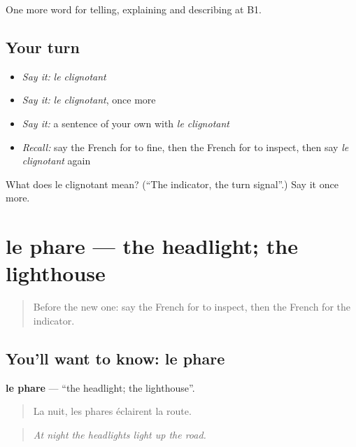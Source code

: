 \begin{grammarlens}[title={What you've built}]
One more word for telling, explaining and describing at B1.
\end{grammarlens}

\subsection*{Your turn}
\begin{itemize}
\raggedright
  \item \emph{Say it:} \emph{le clignotant}
  \item \emph{Say it:} \emph{le clignotant}, once more
  \item \emph{Say it:} a sentence of your own with \emph{le clignotant}
  \item \emph{Recall:} say the French for to fine, then the French for to inspect, then say \emph{le clignotant} again
\end{itemize}

\begin{tcolorbox}[breakable,colback=teal!4,colframe=teal!35!black,title={Before you move on}]
What does le clignotant mean? (\textquotedblleft{}The indicator, the turn signal\textquotedblright{}.) Say it once more.
\end{tcolorbox}
\section[le phare]{le phare — the headlight; the lighthouse}

\label{lesson:FR-C409-phare}



\begin{quote}
Before the new one: say the French for to inspect, then the French for the indicator.
\end{quote}

\subsection*{You'll want to know: le phare}
\textbf{le phare} — \textquotedblleft{}the headlight; the lighthouse\textquotedblright{}.

\begin{quote}
La nuit, les phares éclairent la route.
\end{quote}

\begin{quote}
\emph{At night the headlights light up the road.}
\end{quote}

